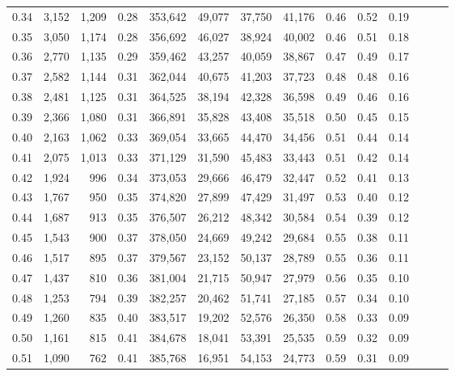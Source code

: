 \begin{tabular}{rrrrrrrrrrrrrr}
0.34 &   3,152 &  1,209 &  0.28 &  353,642 &   49,077 &  37,750 &  41,176 &  0.46 &  0.52 &      0.19 \\
0.35 &   3,050 &  1,174 &  0.28 &  356,692 &   46,027 &  38,924 &  40,002 &  0.46 &  0.51 &      0.18 \\
0.36 &   2,770 &  1,135 &  0.29 &  359,462 &   43,257 &  40,059 &  38,867 &  0.47 &  0.49 &      0.17 \\
0.37 &   2,582 &  1,144 &  0.31 &  362,044 &   40,675 &  41,203 &  37,723 &  0.48 &  0.48 &      0.16 \\
0.38 &   2,481 &  1,125 &  0.31 &  364,525 &   38,194 &  42,328 &  36,598 &  0.49 &  0.46 &      0.16 \\
0.39 &   2,366 &  1,080 &  0.31 &  366,891 &   35,828 &  43,408 &  35,518 &  0.50 &  0.45 &      0.15 \\
0.40 &   2,163 &  1,062 &  0.33 &  369,054 &   33,665 &  44,470 &  34,456 &  0.51 &  0.44 &      0.14 \\
0.41 &   2,075 &  1,013 &  0.33 &  371,129 &   31,590 &  45,483 &  33,443 &  0.51 &  0.42 &      0.14 \\
0.42 &   1,924 &    996 &  0.34 &  373,053 &   29,666 &  46,479 &  32,447 &  0.52 &  0.41 &      0.13 \\
0.43 &   1,767 &    950 &  0.35 &  374,820 &   27,899 &  47,429 &  31,497 &  0.53 &  0.40 &      0.12 \\
0.44 &   1,687 &    913 &  0.35 &  376,507 &   26,212 &  48,342 &  30,584 &  0.54 &  0.39 &      0.12 \\
0.45 &   1,543 &    900 &  0.37 &  378,050 &   24,669 &  49,242 &  29,684 &  0.55 &  0.38 &      0.11 \\
0.46 &   1,517 &    895 &  0.37 &  379,567 &   23,152 &  50,137 &  28,789 &  0.55 &  0.36 &      0.11 \\
0.47 &   1,437 &    810 &  0.36 &  381,004 &   21,715 &  50,947 &  27,979 &  0.56 &  0.35 &      0.10 \\
0.48 &   1,253 &    794 &  0.39 &  382,257 &   20,462 &  51,741 &  27,185 &  0.57 &  0.34 &      0.10 \\
0.49 &   1,260 &    835 &  0.40 &  383,517 &   19,202 &  52,576 &  26,350 &  0.58 &  0.33 &      0.09 \\
0.50 &   1,161 &    815 &  0.41 &  384,678 &   18,041 &  53,391 &  25,535 &  0.59 &  0.32 &      0.09 \\
0.51 &   1,090 &    762 &  0.41 &  385,768 &   16,951 &  54,153 &  24,773 &  0.59 &  0.31 &      0.09 \\

\end{tabular}
